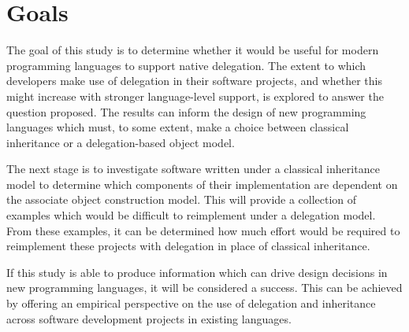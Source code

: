 \section{Goals}
The goal of this study is to determine whether it would be useful for modern programming languages to support native delegation. The extent to which developers make use of delegation in their software projects, and whether this might increase with stronger language-level support, is explored to answer the question proposed. The results can inform the design of new programming languages which must, to some extent, make a choice between classical inheritance or a delegation-based object model.
\newline

The next stage is to investigate software written under a classical inheritance model to determine which components of their implementation are dependent on the associate object construction model. This will provide a collection of examples which would be difficult to reimplement under a delegation model. From these examples, it can be determined how much effort would be required to reimplement these projects with delegation in place of classical inheritance.
\newline

If this study is able to produce information which can drive design decisions in new programming languages, it will be considered a success. This can be achieved by offering an empirical perspective on the use of delegation and inheritance across software development projects in existing languages.